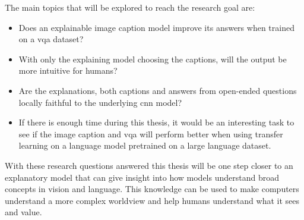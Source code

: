 The main topics that will be explored to reach the research goal are: 
\begin{itemize}
    \item Does an explainable image caption model improve its answers when trained on a \gls{vqa} dataset?
    \item With only the explaining model choosing the captions, will the output be more intuitive for humans?
    \item Are the explanations, both captions and answers from open-ended questions locally faithful to the underlying \gls{cnn} model?
    \item If there is enough time during this thesis, it would be an interesting task to see if the image caption and \gls{vqa} will perform better when using transfer learning  on a language model pretrained on a large language dataset. 
\end{itemize}

With these research questions answered this thesis will be one step closer to an explanatory model that can give insight into how models understand broad concepts in vision and language. This knowledge can be used to make computers understand a more complex worldview and help humans understand what it sees and value.

